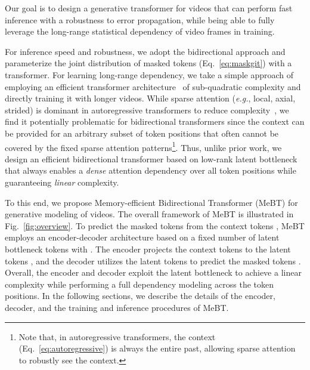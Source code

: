 \documentclass[10pt,twocolumn,letterpaper]{article}
\begin{document}
\ifdefined{} \fi


Our goal is to design a generative transformer for videos that can perform fast inference with a robustness to error propagation, while being able to fully leverage the long-range statistical dependency of video frames in training.

For inference speed and robustness, we adopt the bidirectional approach and parameterize the joint distribution of masked tokens  (Eq.~\eqref{eq:maskgit}) with a transformer.
For learning long-range dependency, we take a simple approach of employing an efficient transformer architecture~\cite{EfficientTransformers} of sub-quadratic complexity and directly training it with longer videos.
While sparse attention (\emph{e.g.}, local, axial, strided) is dominant in autoregressive transformers to reduce complexity~\cite{NUWA, MaskViT, CogVideo, TATS}, we find it potentially problematic for bidirectional transformers since the context  can be provided for an arbitrary subset of token positions that often cannot be covered by the fixed sparse attention patterns\footnote{Note that, in autoregressive transformers, the context  (Eq.~\eqref{eq:autoregressive}) is always the entire past, allowing sparse attention to robustly see the context.}.
Thus, unlike prior work, we design an efficient bidirectional transformer based on low-rank latent bottleneck~\cite{SetTransformer, Linformer, SetVAE, Perceiver, PerceiverIO, LUNA} that always enables a \emph{dense} attention dependency over all token positions while guaranteeing \emph{linear} complexity.



To this end, we propose Memory-efficient Bidirectional Transformer (MeBT) for generative modeling of videos.
The overall framework of MeBT is illustrated in Fig.~\ref{fig:overview}.
To predict the masked tokens  from the context tokens , MeBT employs an encoder-decoder architecture based on a fixed number of latent bottleneck tokens  with .
The encoder projects the context tokens  to the latent tokens , and the decoder utilizes the latent tokens  to predict the masked tokens .
Overall, the encoder and decoder exploit the latent bottleneck to achieve a linear complexity  while performing a full dependency modeling across the token positions.
In the following sections, we describe the details of the encoder, decoder, and the training and inference procedures of MeBT.
\end{document}
